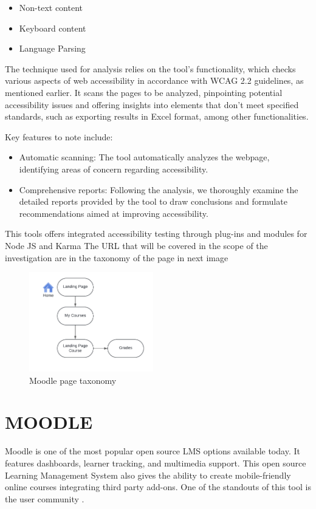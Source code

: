 \documentclass{IEEEtran}
\begin{document}
\begin{itemize}
    \item Non-text content
    \item Keyboard content
    \item Language Parsing
\end{itemize}

The technique used for analysis relies on the tool's functionality, which checks various aspects of web accessibility in accordance with WCAG 2.2 guidelines, as mentioned earlier. It scans the pages to be analyzed, pinpointing potential accessibility issues and offering insights into elements that don't meet specified standards, such as exporting results in Excel format, among other functionalities.

Key features to note include:

\begin{itemize}
    \item Automatic scanning: The tool automatically analyzes the webpage, identifying areas of concern regarding accessibility.
    \item Comprehensive reports: Following the analysis, we thoroughly examine the detailed reports provided by the tool to draw conclusions and formulate recommendations aimed at improving accessibility.
\end{itemize}

This tools offers integrated accessibility testing through plug-ins and modules for Node JS and Karma \cite{Karma}
The URL that will be covered in the scope of the investigation are in the taxonomy of the page in next image

\begin{figure}[H]
    \includegraphics[width=0.48\textwidth]{images/figure1.png}
    \caption{Moodle page taxonomy}
    \label{fig:figure1}
\end{figure}

\section{MOODLE}
Moodle is one of the most popular open source LMS options available today. It features dashboards, learner tracking, and multimedia support. This open source Learning Management System also gives the ability to create mobile-friendly online courses integrating third party add-ons. One of the standouts of this tool is the user community \cite{Moodle2024}.
\end{document}
